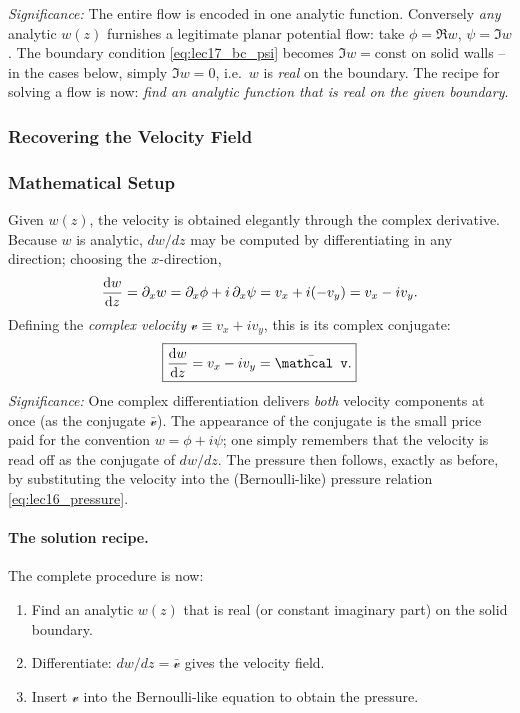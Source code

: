 \documentclass[../main.tex]{subfiles}
\begin{document}
\textit{Significance:} The entire flow is encoded in one analytic function. Conversely \emph{any} analytic $w(z)$ furnishes a legitimate planar potential flow: take $\phi=\Re w$, $\psi=\Im w$. The boundary condition \eqref{eq:lec17_bc_psi} becomes $\Im w=\text{const}$ on solid walls -- in the cases below, simply $\Im w=0$, i.e.\ $w$ is \emph{real} on the boundary. The recipe for solving a flow is now: \emph{find an analytic function that is real on the given boundary}.

\subsubsection{Recovering the Velocity Field}\label{sec:lec17:velocity}

\subsubsection*{Mathematical Setup}
Given $w(z)$, the velocity is obtained elegantly through the complex derivative. Because $w$ is analytic, $dw/dz$ may be computed by differentiating in any direction; choosing the $x$-direction,
\begin{equation}
  \dv{w}{z} = \partial_x w = \partial_x\phi + i\,\partial_x\psi = v_x + i(-v_y) = v_x - i v_y .
  \label{eq:lec17_dwdz}
\end{equation}
Defining the \emph{complex velocity} $\mathcal v \equiv v_x + i v_y$, this is its complex conjugate:
\begin{equation}
  \boxed{\dv{w}{z} = v_x - i v_y = \bar{\mathcal v}.}
  \label{eq:lec17_velocity_complex}
\end{equation}
\textit{Significance:} One complex differentiation delivers \emph{both} velocity components at once (as the conjugate $\bar{\mathcal v}$). The appearance of the conjugate is the small price paid for the convention $w=\phi+i\psi$; one simply remembers that the velocity is read off as the conjugate of $dw/dz$. The pressure then follows, exactly as before, by substituting the velocity into the (Bernoulli-like) pressure relation \eqref{eq:lec16_pressure}.

\paragraph{The solution recipe.} The complete procedure is now:
\begin{enumerate}
  \item Find an analytic $w(z)$ that is real (or constant imaginary part) on the solid boundary.
  \item Differentiate: $dw/dz=\bar{\mathcal v}$ gives the velocity field.
  \item Insert $\mathcal v$ into the Bernoulli-like equation to obtain the pressure.
\end{enumerate}
\end{document}
